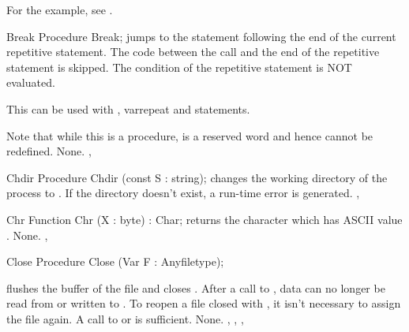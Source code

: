 For the example, see .

\begin{procedure}{Break}
\Declaration
Procedure Break;
\Description
{} jumps to the statement following the end of the current
repetitive statement. The code between the  call and
the end of the repetitive statement is skipped.
The condition of the repetitive statement is NOT evaluated.

This can be used with , var{repeat} and  statements.

Note that while this is a procedure,  is a reserved word
and hence cannot be redefined.
\Errors
None.
\SeeAlso
{}, 
\end{procedure}


\begin{procedure}{Chdir}
\Declaration
Procedure Chdir (const S : string);
\Description
{} changes the working directory of the process to .
\Errors
If the directory  doesn't exist, a run-time error is generated.
\SeeAlso
{}, 
\end{procedure}


\begin{function}{Chr}
\Declaration
Function Chr (X : byte) : Char;
\Description
{} returns the character which has ASCII value .
\Errors
None.
\SeeAlso
{}, 
\end{function}


\begin{procedure}{Close}
\Declaration
Procedure Close (Var F : Anyfiletype);

\Description
{} flushes the buffer of the file  and closes .
After a call to , data can no longer be read from or written to
.
To reopen a file closed with , it isn't necessary to assign the
file again. A call to  or  is sufficient.
\Errors
None.
\SeeAlso
{}, , , 
\end{procedure}



